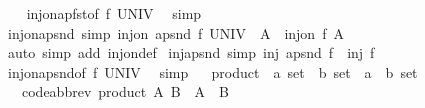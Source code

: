 \begin{isabellebody}
\ \ %
\endisadelimproof
%
\isatagproof
{}\isamarkupfalse%
\ inj{\isacharunderscore}{\kern0pt}on{\isacharunderscore}{\kern0pt}apfst{\isacharbrackleft}{\kern0pt}of\ f\ UNIV{\isacharbrackright}{\kern0pt}\ \isamarkupfalse%
\ simp%
\endisatagproof
{\isafoldproof}%
%
\isadelimproof
\isanewline
%
\endisadelimproof
\isanewline
{}\isamarkupfalse%
\ inj{\isacharunderscore}{\kern0pt}on{\isacharunderscore}{\kern0pt}apsnd\ {\isacharbrackleft}{\kern0pt}simp{\isacharbrackright}{\kern0pt}{\isacharcolon}{\kern0pt}\ {\isachardoublequoteopen}inj{\isacharunderscore}{\kern0pt}on\ {\isacharparenleft}{\kern0pt}apsnd\ f{\isacharparenright}{\kern0pt}\ {\isacharparenleft}{\kern0pt}UNIV\ {\isasymtimes}\ A{\isacharparenright}{\kern0pt}\ {\isasymlongleftrightarrow}\ inj{\isacharunderscore}{\kern0pt}on\ f\ A{\isachardoublequoteclose}\isanewline
%
\isadelimproof
\ \ %
\endisadelimproof
%
\isatagproof
{}\isamarkupfalse%
\ {\isacharparenleft}{\kern0pt}auto\ simp\ add{\isacharcolon}{\kern0pt}\ inj{\isacharunderscore}{\kern0pt}on{\isacharunderscore}{\kern0pt}def{\isacharparenright}{\kern0pt}%
\endisatagproof
{\isafoldproof}%
%
\isadelimproof
\isanewline
%
\endisadelimproof
\isanewline
{}\isamarkupfalse%
\ inj{\isacharunderscore}{\kern0pt}apsnd\ {\isacharbrackleft}{\kern0pt}simp{\isacharbrackright}{\kern0pt}{\isacharcolon}{\kern0pt}\ {\isachardoublequoteopen}inj\ {\isacharparenleft}{\kern0pt}apsnd\ f{\isacharparenright}{\kern0pt}\ {\isasymlongleftrightarrow}\ inj\ f{\isachardoublequoteclose}\isanewline
%
\isadelimproof
\ \ %
\endisadelimproof
%
\isatagproof
{}\isamarkupfalse%
\ inj{\isacharunderscore}{\kern0pt}on{\isacharunderscore}{\kern0pt}apsnd{\isacharbrackleft}{\kern0pt}of\ f\ UNIV{\isacharbrackright}{\kern0pt}\ \isamarkupfalse%
\ simp%
\endisatagproof
{\isafoldproof}%
%
\isadelimproof
\isanewline
%
\endisadelimproof
\isanewline
{}\isamarkupfalse%
\isanewline
{}\isanewline
\isanewline
{}\ \isamarkupfalse%
\ product\ {\isacharcolon}{\kern0pt}{\isacharcolon}{\kern0pt}\ {\isachardoublequoteopen}{\isacharprime}{\kern0pt}a\ set\ {\isasymRightarrow}\ {\isacharprime}{\kern0pt}b\ set\ {\isasymRightarrow}\ {\isacharparenleft}{\kern0pt}{\isacharprime}{\kern0pt}a\ {\isasymtimes}\ {\isacharprime}{\kern0pt}b{\isacharparenright}{\kern0pt}\ set{\isachardoublequoteclose}\isanewline
\ \ \ {\isacharbrackleft}{\kern0pt}code{\isacharunderscore}{\kern0pt}abbrev{\isacharbrackright}{\kern0pt}{\isacharcolon}{\kern0pt}\ {\isachardoublequoteopen}product\ A\ B\ {\isacharequal}{\kern0pt}\ A\ {\isasymtimes}\ B{\isachardoublequoteclose}\isanewline

\end{isabellebody}
